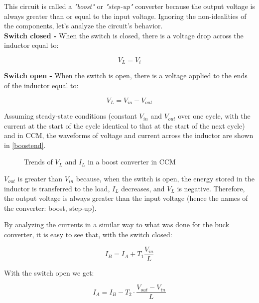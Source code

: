 \documentclass[../main.tex]{subfiles}
\begin{document}
This circuit is called a \textit{"boost"} or \textit{"step-up"} converter because the output voltage is always greater than or equal to the input voltage. 
Ignoring the non-idealities of the components, let’s analyze the circuit’s behavior.\\

\textbf{Switch closed -} When the switch is closed, there is a voltage drop across the inductor equal to:

\begin{equation}
	V_L = V_i
\end{equation}


\textbf{Switch open -} When the switch is open, there is a voltage applied to the ends of the inductor equal to:

\begin{equation}
	V_L = V_{in} - V_{out}
\end{equation}

Assuming steady-state conditions (constant $V_{in}$ and $V_{out}$ over one cycle, with the current at the start of the cycle identical to that at the start of the next cycle) and in CCM, the waveforms of voltage and current across the inductor are shown in \autoref{boostend}.

\begin{figure}[h!]
\begin{center}


\label{boostend}
\caption{Trends of $V_L$ and $I_L$ in a boost converter in CCM}	
\end{center}
\end{figure}


$V_{out}$ is greater than $V_{in}$ because, when the switch is open, the energy stored in the inductor is transferred to the load, $I_L$ decreases, and $V_L$ is negative. Therefore, the output voltage is always greater than the input voltage (hence the names of the converter: boost, step-up).

By analyzing the currents in a similar way to what was done for the buck converter, it is easy to see that, with the switch closed:

\begin{equation}
	I_B = I_A + T_1 \frac{V_{in}}{L}
\end{equation}

With the switch open we get:

\begin{equation}
	I_A = I_B - T_2 \cdot \frac{V_{out} - V_{in}}{L}
\end{equation}
\end{document}
